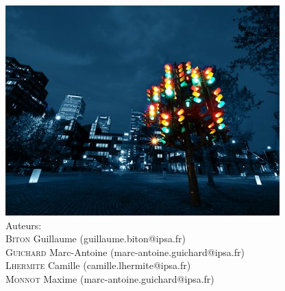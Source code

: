 \begin{titlepage}
 \includegraphics[scale=0.45]{Graphics/illustration.jpg}\\[2.5cm]

{\normalsize Auteurs:}\\
\small
\textsc{Biton} Guillaume (guillaume.biton@ipsa.fr)\\
\textsc{Guichard} Marc-Antoine \small(marc-antoine.guichard@ipsa.fr)\\
\textsc{Lhermite} Camille \small(camille.lhermite@ipsa.fr)\\
\textsc{Monnot} Maxime \small(marc-antoine.guichard@ipsa.fr)\\[1cm]

 

\vfill %

\restoregeometry

\end{titlepage}